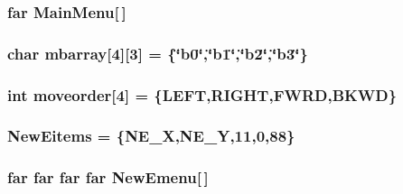 \label{WL__MENU_8C_a93c27abff0c41dacc4c91cba6616ebc8}
\hypertarget{WL__MENU_8C_a6d3982b9d13e9f258a6229f7c6259fd2}{
\subsubsection[{MainMenu}]{ far {\bf MainMenu}\mbox{[}$\,$\mbox{]}}}
\label{WL__MENU_8C_a6d3982b9d13e9f258a6229f7c6259fd2}
\hypertarget{WL__MENU_8C_a8de55afa8bdf66f3a7e239b17b252799}{
\subsubsection[{mbarray}]{\setlength{\rightskip}{0pt plus 5cm}char {\bf mbarray}\mbox{[}4\mbox{]}\mbox{[}3\mbox{]} = \{\char`\"{}b0\char`\"{},\char`\"{}b1\char`\"{},\char`\"{}b2\char`\"{},\char`\"{}b3\char`\"{}\}}}
\label{WL__MENU_8C_a8de55afa8bdf66f3a7e239b17b252799}
\hypertarget{WL__MENU_8C_a5d4e98961f91335c9e7de9fb8313cd08}{
\subsubsection[{moveorder}]{\setlength{\rightskip}{0pt plus 5cm}int {\bf moveorder}\mbox{[}4\mbox{]} = \{LEFT,RIGHT,FWRD,BKWD\}}}
\label{WL__MENU_8C_a5d4e98961f91335c9e7de9fb8313cd08}
\hypertarget{WL__MENU_8C_a938f63a08d947fa7b0abf03c1349115a}{
\subsubsection[{NewEitems}]{ {\bf NewEitems} = \{NE\_\-X,NE\_\-Y,11,0,88\}}}
\label{WL__MENU_8C_a938f63a08d947fa7b0abf03c1349115a}
\hypertarget{WL__MENU_8C_a85bfcab0002ae45a5d151750dee054d8}{
\subsubsection[{NewEmenu}]{ far far far far {\bf NewEmenu}\mbox{[}$\,$\mbox{]}}}
